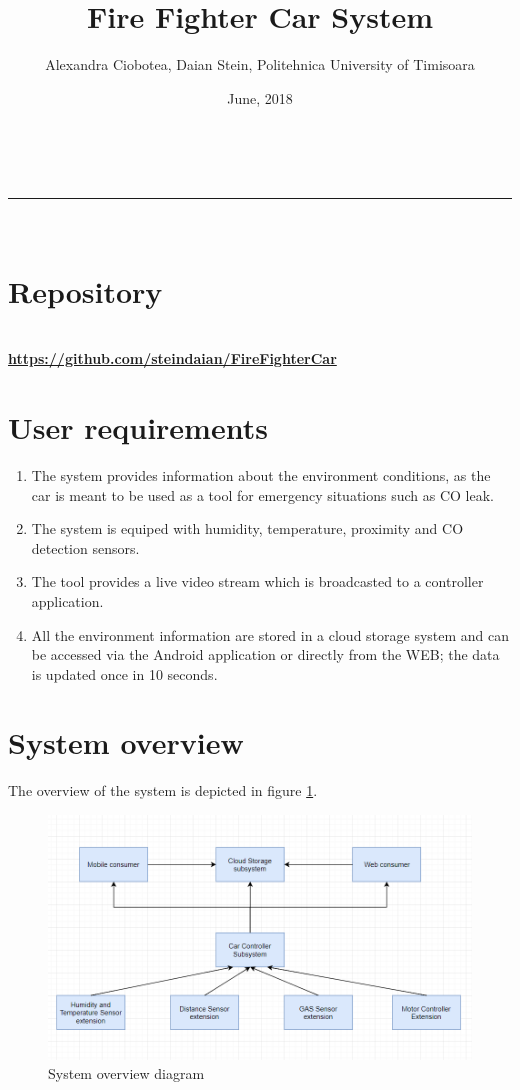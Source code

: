\documentclass[a4paper,11pt]{article}
\makeatletter
\newcommand{\divider}{\rule{\linewidth}{0.5pt}}
\renewcommand{\maketitle}{
\begin{center}
\vspace{2ex}
{\huge \textsc{\@title}}
\vspace{1ex}
\\
\divider\\
\@author \hfill \@date
\vspace{4ex}
\end{center}
}
\makeatother
\begin{document}
\title{Fire Fighter Car System}

\author{Alexandra Ciobotea, Daian Stein, Politehnica University of Timisoara}

\date{June, 2018}

\maketitle


\section{Repository}
\\
\textbf{\url{https://github.com/steindaian/FireFighterCar}}

\section{User requirements}

\begin{enumerate}  
\item The system provides information about the environment conditions, as the car is meant to be used as a tool for emergency situations such as CO leak.
\item The system is equiped with humidity, temperature, proximity and CO detection sensors.
\item The tool provides a live video stream which is broadcasted to a controller application.
\item All the environment information are stored in a cloud storage system and can be accessed via the Android application or directly from the WEB; the data is updated once in 10 seconds.
\end{enumerate}

\section{System overview}

The overview of the system is depicted in figure \ref{fig:system}.

\begin{figure}[h]
\centering
\includegraphics[scale=0.5]{overview.png}
\caption{System overview diagram}
\label{fig:system}
\end{figure}
\end{document}
